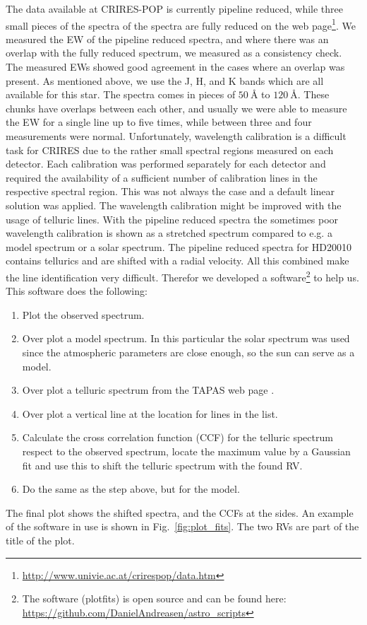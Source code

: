 \documentclass{aa}
\begin{document}
The data available at CRIRES-POP is currently pipeline reduced, while
three small pieces of the spectra of the spectra are fully reduced on
the web page\footnote{\url{http://www.univie.ac.at/crirespop/data.htm}}.
We measured the EW of the pipeline reduced spectra, and where there
was an overlap with the fully reduced spectrum, we measured as a
consistency check. The measured EWs showed good agreement in the cases
where an overlap was present. As mentioned above, we use the J, H,
and K bands which are all available for this star. The spectra comes
in pieces of $\SI{50}{\angstrom}$ to $\SI{120}{\angstrom}$. These
chunks have overlaps between each other, and usually we were able
to measure the EW for a single line up to five times, while between
three and four measurements were normal. Unfortunately, wavelength
calibration is a difficult task for CRIRES due to the rather small
spectral regions measured on each detector. Each calibration was
performed separately for each detector and required the availability
of a sufficient number of calibration lines in the respective spectral
region. This was not always the case and a default linear solution
was applied. The wavelength calibration might be improved with the
usage of telluric lines. With the pipeline reduced spectra the
sometimes poor wavelength calibration is shown as a stretched spectrum
compared to e.g. a model spectrum or a solar spectrum. The pipeline
reduced spectra for HD20010 contains tellurics and are shifted with a
radial velocity. All this combined make the line identification very
difficult. Therefor we developed a software\footnote{The software
(plot\textunderscore{}fits) is open source and can be found here:
\url{https://github.com/DanielAndreasen/astro_scripts}} to help us. This
software does the following:
\begin{enumerate}
    \item Plot the observed spectrum.
    \item Over plot a model spectrum. In this particular the solar spectrum was
        used since the atmospheric parameters are close enough, so the sun can
        serve as a model.
    \item Over plot a telluric spectrum from the TAPAS web page \citep{Bertaux2014}.
    \item Over plot a vertical line at the location for lines in the list.
    \item Calculate the cross correlation function (CCF) for the telluric spectrum
        respect to the observed spectrum, locate the maximum value by a Gaussian fit
        and use this to shift the telluric spectrum with the found RV.
    \item Do the same as the step above, but for the model.
\end{enumerate}
The final plot shows the shifted spectra, and the CCFs at the sides. An
example of the software in use is shown in Fig.~\ref{fig:plot_fits}. The
two RVs are part of the title of the plot.
\end{document}
